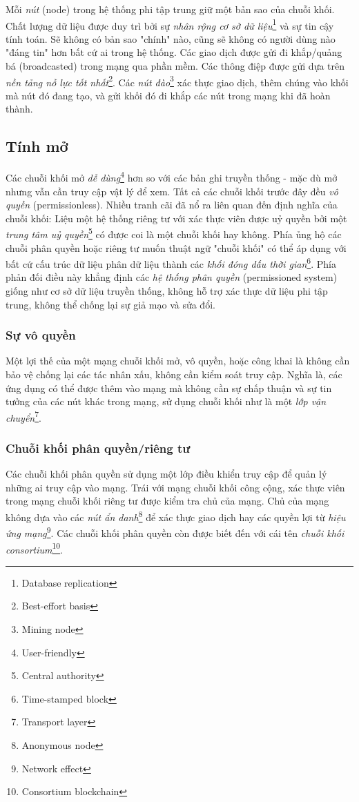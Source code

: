 Mỗi \textit{nút} (node) trong hệ thống phi tập trung giữ một bản sao của chuỗi khối. Chất lượng dữ liệu được duy trì bởi sự \textit{nhân rộng cơ sở dữ liệu}\footnote{Database replication} và sự tin cậy tính toán. Sẽ không có bản sao "chính" nào, cũng sẽ không có người dùng nào "đáng tin" hơn bất cứ ai trong hệ thống. Các giao dịch được gửi đi khắp/quảng bá (broadcasted) trong mạng qua phần mềm. Các thông điệp được gửi dựa trên \textit{nền tảng nỗ lực tốt nhất}\footnote{Best-effort basis}. Các \textit{nút đào}\footnote{Mining node} xác thực giao dịch, thêm chúng vào khối mà nút đó đang tạo, và gửi khối đó đi khắp các nút trong mạng khi đã hoàn thành.

\subsection{Tính mở}

Các chuỗi khối mở \textit{dễ dùng}\footnote{User-friendly} hơn so với các bản ghi truyền thống - mặc dù mở nhưng vẫn cần truy cập vật lý để xem. Tất cả các chuỗi khối trước đây đều \textit{vô quyền} (permissionless). Nhiều tranh cãi đã nổ ra liên quan đến định nghĩa của chuỗi khối: Liệu một hệ thống riêng tư với xác thực viên được uỷ quyền bởi một \textit{trung tâm uỷ quyền}\footnote{Central authority} có được coi là một chuỗi khối hay không. Phía ủng hộ các chuỗi phân quyền hoặc riêng tư muốn thuật ngữ "chuỗi khối" có thể áp dụng với bất cứ cấu trúc dữ liệu phân dữ liệu thành các \textit{khối đóng dấu thời gian}\footnote{Time-stamped block}. Phía phản đối điều này khẳng định các \textit{hệ thống phân quyền} (permissioned system) giống như cơ sở dữ liệu truyền thống, không hỗ trợ xác thực dữ liệu phi tập trung, không thể chống lại sự giả mạo và sửa đổi.

\subsubsection{Sự vô quyền}
Một lợi thế của một mạng chuỗi khối mở, vô quyền, hoặc công khai là không cần bảo vệ chống lại các tác nhân xấu, không cần kiểm soát truy cập. Nghĩa là, các ứng dụng có thể được thêm vào mạng mà không cần sự chấp thuận và sự tin tưởng của các nút khác trong mạng, sử dụng chuỗi khối như là một \textit{lớp vận chuyển}\footnote{Transport layer}.

\subsubsection{Chuỗi khối phân quyền/riêng tư}
Các chuỗi khối phân quyền sử dụng một lớp điều khiển truy cập để quản lý những ai truy cập vào mạng. Trái với mạng chuỗi khối công cộng, xác thực viên trong mạng chuỗi khối riêng tư được kiểm tra chủ của mạng. Chủ của mạng không dựa vào các \textit{nút ẩn danh}\footnote{Anonymous node} để xác thực giao dịch hay các quyền lợi từ \textit{hiệu ứng mạng}\footnote{Network effect}. Các chuỗi khối phân quyền còn được biết đến với cái tên \textit{chuỗi khối consortium}\footnote{Consortium blockchain}.

